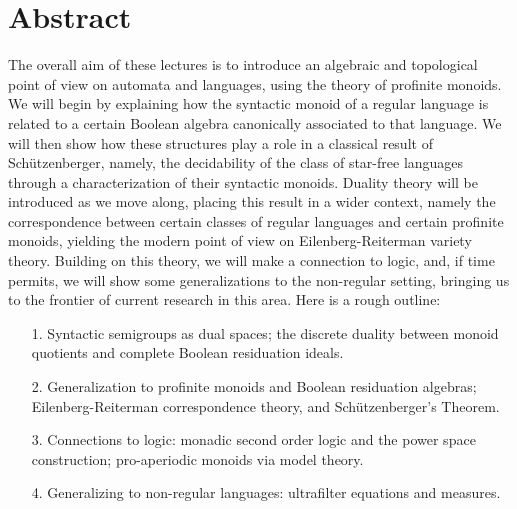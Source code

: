 \section*{Abstract}
The overall aim of these lectures is to introduce an algebraic and topological point of view on automata and languages, using the theory of profinite monoids. We will begin by explaining how the syntactic monoid of a regular language is related to a certain Boolean algebra canonically associated to that language. We will then show how these structures play a role in a classical result of Schützenberger, namely, the decidability of the class of star-free languages through a characterization of their syntactic monoids. Duality theory will be introduced as we move along, placing this result in a wider context, namely the correspondence between certain classes of regular languages and certain profinite monoids, yielding the modern point of view on Eilenberg-Reiterman variety theory. Building on this theory, we will make a connection to logic, and, if time permits, we will show some generalizations to the non-regular setting, bringing us to the frontier of current research in this area. Here is a rough outline:
\begin{enumerate}
\item[1.]  Syntactic semigroups as dual spaces; the discrete duality between monoid quotients and complete Boolean residuation ideals.
\item[2.]   Generalization to profinite monoids and Boolean residuation algebras; Eilenberg-Reiterman correspondence theory, and Schützenberger's Theorem.
\item[3.]    Connections to logic: monadic second order logic and the power space construction; pro-aperiodic monoids via model theory.
\item[4.]   Generalizing to non-regular languages: ultrafilter equations and measures.
\end{enumerate}


